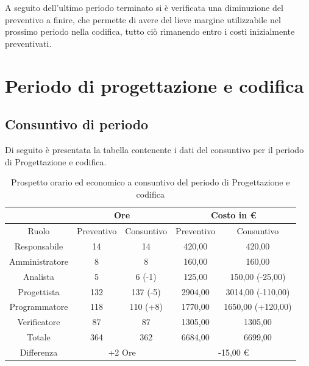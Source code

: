 \documentclass[./PianodiProgetto.tex]{subfiles}
\begin{document}
\noindent A seguito dell'ultimo periodo terminato si è verificata una diminuzione del preventivo a finire, che permette di avere del lieve margine utilizzabile nel prossimo periodo nella codifica, tutto ciò rimanendo entro i costi inizialmente preventivati.

\section{Periodo di progettazione e codifica}
\subsection{Consuntivo di periodo}
Di seguito è presentata la tabella contenente i dati del consuntivo per il periodo di Progettazione e codifica.

\begin{table}[H]
	\centering
	\begin{tabular}{|c|c|c|c|c|}
		\hline
		& \multicolumn{2}{c|}{Ore} & \multicolumn{2}{c|}{Costo in \euro{}}  \\ \hline
		Ruolo&Preventivo&Consuntivo&Preventivo&Consuntivo \\ \hline
		Responsabile&14&14&420,00&420,00 \\ \hline
		Amministratore&8&8&160,00&160,00 \\ \hline
		Analista&5&6 (-1)&125,00&150,00 (-25,00)\\ \hline
		Progettista&132&137 (-5)&2904,00&3014,00 (-110,00) \\ \hline
		Programmatore&118&110 (+8)&1770,00&1650,00 (+120,00) \\ \hline
		Verificatore&87&87&1305,00&1305,00 \\ \hline
		Totale&364&362&6684,00&6699,00 \\ \hline
		Differenza& \multicolumn{2}{c|}{+2 Ore} & \multicolumn{2}{c|}{-15,00 \euro{}} \\ \hline
	\end{tabular}
	\caption{Prospetto orario ed economico a consuntivo del periodo di Progettazione e codifica}
\end{table}
\end{document}
